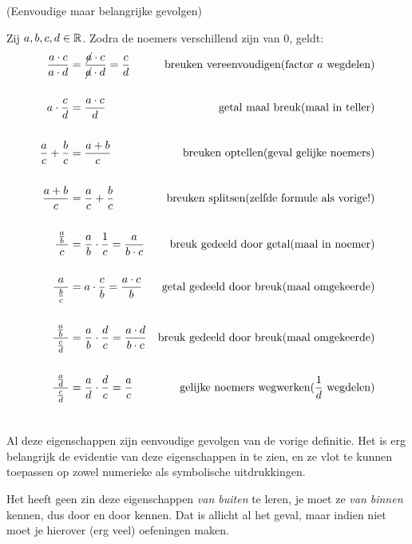 \documentclass{ximera}
\begin{document}
\begin{proposition} (Eenvoudige maar belangrijke gevolgen) \label{breuken}
\nopagebreak[4]    %
	
	Zij $a,b,c,d\in \mathbb{R}$. Zodra de noemers verschillend zijn van $0$, geldt:
{
\begin{align*}
		\frac{a\cdot c}{a\cdot d} &= 	\frac{\cancel{a}\cdot c}{\cancel{a}\cdot d} = \frac{c}{d} 
			& \text{breuken vereenvoudigen} \hfill\text{(factor $a$ wegdelen)} \\ \\
		a\cdot \frac{c}{d}   &= \frac{a\cdot c}{d} 
			& \text{getal maal breuk}\hfill \text{(maal in teller)} \\ \\
		\frac{a}{c}+\frac{b}{c}  &= \frac{a+b}{c} 
			& \text{breuken optellen}\hfill\text{(geval gelijke noemers)} \\ \\
		\frac{a+b}{c} &= \frac{a}{c}+\frac{b}{c}  
			& \text{breuken splitsen} \hfill\text{(zelfde formule als vorige!)}\\ \\
		\frac{\frac{a}{b}}{\ c\ } &= \frac ab \cdot \frac 1c = \frac{a}{b\cdot c} 
		& \text{breuk gedeeld door getal}\hfill\text{(maal in noemer)}\\ \\
		\frac{a}{\ \frac{b}{c}\ } &= a\cdot \frac cb = \frac{a\cdot c}{b}
		& \text{getal gedeeld door breuk}\hfill\text{(maal omgekeerde)}\\ \\
		\frac{\frac{a}{b}}{\ \frac{c}{d}\ } &= \frac ab \cdot \frac dc =  \frac{a\cdot d}{b\cdot c}
		& \text{breuk gedeeld door breuk}\hfill\text{(maal omgekeerde)}\\ \\
		\frac{\frac{a}{d}}{\ \frac{c}{d}\ } &= \frac ad \cdot \frac dc =  \frac{a}{c}
		& \text{gelijke noemers wegwerken}\hfill\text{($\frac 1d$ wegdelen)}\\ \\
		\end{align*}
}
\end{proposition}


Al deze eigenschappen zijn eenvoudige gevolgen van de vorige definitie. Het is erg belangrijk de evidentie van deze eigenschappen in te zien, en ze vlot te kunnen toepassen op zowel numerieke als symbolische uitdrukkingen.

Het heeft geen zin deze eigenschappen \textit{van buiten} te leren, je moet ze \textit{van binnen} kennen, dus door en door kennen. Dat is allicht al het geval, maar indien niet moet je hierover (erg veel) oefeningen maken.
\end{document}
